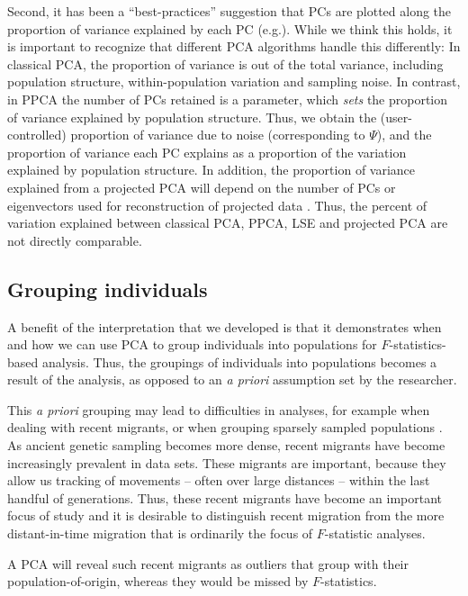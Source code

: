 \documentclass[12pt, letterpaper]{article}
\begin{document}
Second, it has been a ``best-practices'' suggestion that PCs are plotted along the proportion of variance explained by each PC (e.g.\cite{novembre_recent_2016, elhaik_principal_2022}). While we think this holds, it is important to recognize that different PCA algorithms handle this differently: In classical PCA, the proportion of variance is out of the total variance, including population structure, within-population variation and sampling noise. In contrast, in PPCA the number of PCs retained is a parameter, which \emph{sets} the proportion of variance explained by population structure. Thus, we obtain the (user-controlled) proportion of variance due to noise (corresponding to $\Psi$), and the proportion of variance each PC explains as a proportion of the variation explained by population structure. In addition, the proportion of variance explained from a projected PCA will depend on the number of PCs or eigenvectors used for reconstruction of projected data \cite{patterson_population_2006}. 
Thus, the percent of variation explained between classical PCA, PPCA, LSE and projected PCA are not directly comparable.

\subsection{Grouping individuals}
A benefit of the interpretation that we developed is that it demonstrates when and how we can use PCA to group individuals into populations for $F$-statistics-based analysis. 
Thus, the groupings of individuals into populations becomes a result of the analysis, as opposed to an \textit{a priori} assumption set by the researcher.

This \textit{a priori} grouping may lead to difficulties in analyses, for example when dealing with recent migrants, or when grouping sparsely sampled populations \cite{shringarpure_effects_2014}. As ancient genetic sampling becomes more dense, recent migrants have become increasingly prevalent in data sets. These migrants are important, because they allow us tracking of movements -- often over large distances -- within the last handful of generations. Thus, these recent migrants have become an important focus of study and it is desirable to distinguish recent migration from the more distant-in-time migration that is ordinarily the focus of $F$-statistic analyses.

A PCA will reveal such recent migrants as outliers that group with their population-of-origin, whereas they would be missed by $F$-statistics.
\end{document}
